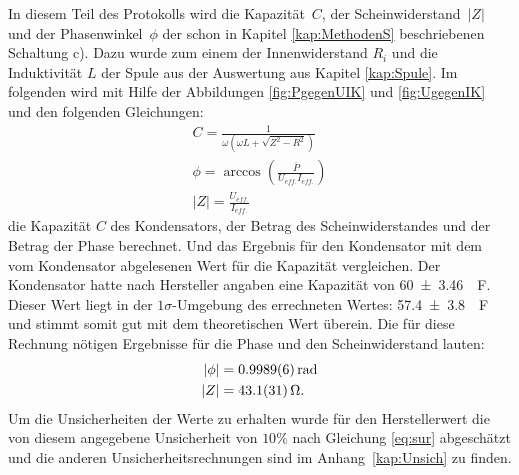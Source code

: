 In diesem Teil des Protokolls wird die Kapazität~$C$, der Scheinwiderstand~$|Z|$ und der Phasenwinkel~$\phi $ der schon in Kapitel \ref{kap:MethodenS} beschriebenen Schaltung c). 
Dazu wurde zum einem der Innenwiderstand $R_i$ und die Induktivität $L$ der Spule aus der Auswertung aus Kapitel \ref{kap:Spule}.
Im folgenden wird mit Hilfe der Abbildungen \ref{fig:PgegenUIK} und \ref{fig:UgegenIK}
und den folgenden Gleichungen:
\begin{align}
C=\frac{1}{\omega (\omega L+\sqrt{Z^2-R^2})}\\	
\phi = \arccos\left(\frac{\bar{P}}{U_{eff.}I_{eff.}}\right)\\
	|Z|=\frac{U_{eff.}}{I_{eff.}}
\end{align}
die Kapazität $C$ des Kondensators, der Betrag des Scheinwiderstandes und der Betrag der Phase berechnet. Und das Ergebnis für den Kondensator mit dem vom Kondensator abgelesenen Wert für die Kapazität vergleichen.
Der Kondensator hatte nach Hersteller angaben eine Kapazität von \SI{60+-3.46}{\mu F}.
Dieser Wert liegt in der $1\sigma$-Umgebung des errechneten Wertes: \SI{57.4+-3.8}{\mu F} und stimmt somit gut mit dem theoretischen Wert überein.
Die für diese Rechnung nötigen Ergebnisse für die Phase und den Scheinwiderstand lauten:
\begin{align}
	|\phi| &=\SI{0.9989+-0.0006}{rad}\\
	|Z| &=\SI{43.1+-3.1}{\ohm}.
\end{align}
Um die Unsicherheiten der Werte zu erhalten wurde für den Herstellerwert die von diesem angegebene Unsicherheit von $10\%$ nach Gleichung
\ref{eq:sur} abgeschätzt und die anderen Unsicherheitsrechnungen sind im Anhang~\ref{kap:Unsich} zu finden.
